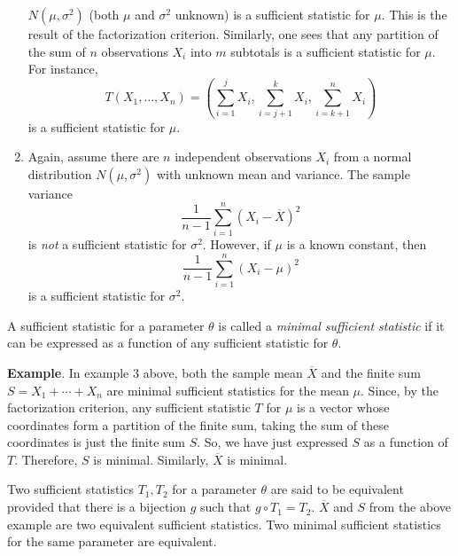 \documentclass[12pt]{article}
\begin{document}
\begin{enumerate}
$N(\mu,\sigma^2)$ (both $\mu$ and $\sigma^2$ unknown) is a
sufficient statistic for $\mu$.  This is the result of the
factorization criterion. Similarly, one sees that any partition of
the sum of $n$ observations $X_i$ into $m$ subtotals is a sufficient
statistic for $\mu$.  For instance,
$$T(X_1,\ldots,X_n)=(\sum_{i=1}^{j}X_i,\sum_{i=j+1}^{k}X_i,\sum_{i=k+1}^{n}X_i)$$
is a sufficient statistic for $\mu$.
\item Again, assume there are $n$ independent observations $X_i$ from
a normal distribution $N(\mu,\sigma^2)$ with unknown mean and
variance.  The sample variance
$$\frac{1}{n-1}\sum_{i=1}^{n}(X_i-\overline{X})^2$$ is \emph{not} a
sufficient statistic for $\sigma^2$.  However, if $\mu$ is a known
constant, then
$$\frac{1}{n-1}\sum_{i=1}^{n}(X_i-\mu)^2$$ is a sufficient statistic
for $\sigma^2$.
\end{enumerate}

A sufficient statistic for a parameter $\theta$ is called
a \emph{minimal sufficient statistic} if it can be expressed as a
function of any sufficient statistic for $\theta$.

\textbf{Example}. In example $3$ above, both the sample mean
$\overline{X}$ and the finite sum $S=X_1+\cdots+X_n$ are minimal
sufficient statistics for the mean $\mu$.  Since, by the
factorization criterion, any sufficient statistic $T$ for $\mu$ is a
vector whose coordinates form a partition of the finite sum, taking
the sum of these coordinates is just the finite sum $S$.  So, we
have just expressed $S$ as a function of $T$.  Therefore, $S$ is
minimal.  Similarly, $\overline{X}$ is minimal.

Two sufficient statistics $T_1,T_2$ for a parameter $\theta$ are
said to be equivalent provided that there is a bijection $g$ such
that $g\circ T_1=T_2$.  $\overline{X}$ and $S$ from the above
example are two equivalent sufficient statistics.  Two minimal sufficient statistics for the same parameter are equivalent.
\end{document}
